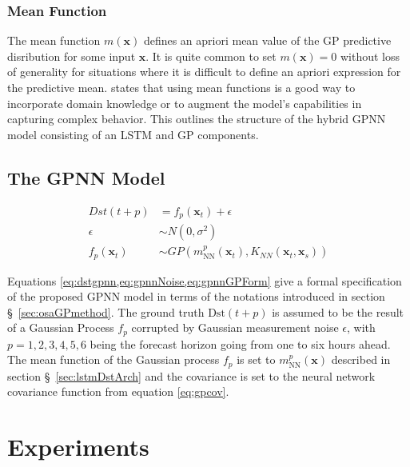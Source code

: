 \subsubsection*{Mean Function}

The mean function $m \left( \mathbf{x} \right)$ defines an apriori mean value of the GP predictive disribution for 
some input $\mathbf{x}$. It is quite common to set $m(\mathbf{x}) = 0$ without loss of generality for situations where 
it is difficult to define an apriori expression for the predictive mean. 
\citet[ch.~2,sec.~2.7]{Rasmussen:2005:GPM:1162254} states that using mean functions is a good way to incorporate 
domain knowledge or to augment the model's capabilities in capturing complex behavior. This outlines the structure 
of the hybrid GPNN model consisting of an LSTM and GP components. 

\subsection{The GPNN Model}

\begin{align}
	Dst \left( t+p \right) &= f_{p} \left( \mathbf{x}_{t} \right) + \epsilon \label{eq:dstgpnn}\\ 
	\epsilon &\sim N \left( 0, \sigma ^{2} \right)  \label{eq:gpnnNoise}\\
	f_{p} \left( \mathbf{x}_{t} \right)  &\sim 
	GP \left( m^{p}_{\text{NN}}(\mathbf{x}_t) , K_{NN}(\mathbf{x}_{t}, \mathbf{x}_{s} ) \right) \label{eq:gpnnGPForm}
\end{align}
	

Equations \cref{eq:dstgpnn,eq:gpnnNoise,eq:gpnnGPForm} give a formal specification of the proposed GPNN model in 
terms of the notations introduced in section \S~\ref{sec:osaGPmethod}. The ground truth $\text{Dst}\left(t + p \right)$ 
is assumed to be the result of a Gaussian Process $f_{p}$ corrupted by Gaussian measurement noise $\epsilon$, 
with $p = {1,2,3,4,5,6}$ being the forecast horizon going from one to six hours ahead. The mean function of the 
Gaussian process $f_{p}$ is set to $m^{p}_{\text{NN}} \left( \mathbf{x} \right)$ described in 
section \S~\ref{sec:lstmDstArch} and the covariance is set to the neural network covariance function 
from equation \ref{eq:gpcov}. 


\section{Experiments} \label{sec:resultsgpnn}

